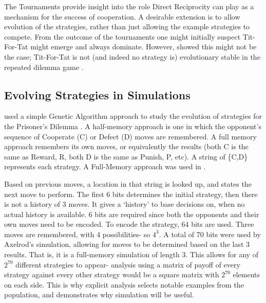 \documentclass[a4paper,11pt,bcshonoursthesis,singlespace,twoside]{cssethesis}
\begin{document}
The Tournaments provide insight into the role Direct Reciprocity can play as a mechanism for the success of cooperation. 
A desirable extension is to allow evolution of the strategies, rather than just allowing the example strategies to compete. 
From the outcome of the tournaments one might initially suspect Tit-For-Tat might emerge and always dominate. However, \citet{boyd1987no} showed this might not be the case; Tit-For-Tat is not (and indeed no strategy is) evolutionary stable in the repeated dilemma game \citep{boyd1987no, van2010and}. 

\subsection{Evolving Strategies in Simulations}
\label{sec:axelrodEvolving}
\citet{axelrod1987evolution} used a simple Genetic Algorithm approach to study the evolution of strategies for the Prisoner's Dilemma \citep{back1997handbook}. A half-memory approach is one in which the opponent's sequence of Cooperate (C) or Defect (D) moves are remembered. A full memory approach remembers its own moves, or equivalently the results (both C is the same as Reward, R, both D is the same as Punish, P, etc). A string of \{C,D\} represents each strategy. A Full-Memory approach was used in \citet{axelrod1987evolution}. 

Based on previous moves, a location in that string is looked up, and states the next move to perform. 
The first 6 bits determines the initial strategy, then there is not a history of 3 moves. 
It gives a `history' to base decisions on, when no actual history is available. 
6 bits are required since both the opponents and their own moves need to be encoded. 
To encode the strategy, 64 bits are used. Three moves are remembered, with 4 possibilities- so $4^3$. 
A total of 70 bits were used by Axelrod's simulation, allowing for moves to be determined based on the last 3 results. That is, it is a full-memory simulation of length 3. 
This allows for any of $2^{70}$ different strategies to appear- analysis using a matrix of payoff of every strategy against every other strategy would be a square matrix with $2^{70}$ elements on each side. 
This is why explicit analysis selects notable examples from the population, and demonstrates why simulation will be useful. 
\end{document}

